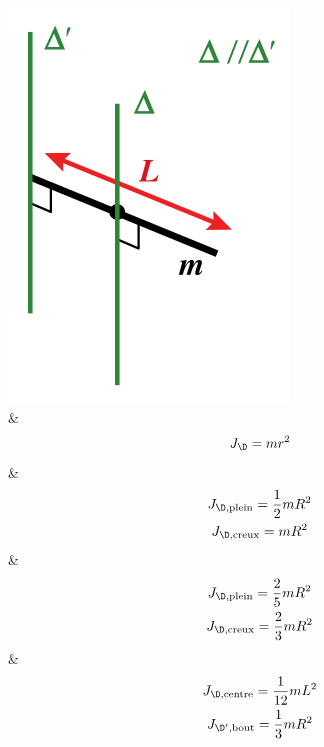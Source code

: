\documentclass[../../main/main.tex]{subfiles}
\begin{document}
\begin{tcb*}[tabularx={l|Y|Y|Y|Y|}]
	\includegraphics[scale=1]{Jd_tige}
	\\\hline
	 &
	\begin{gather*}
		J_{\D} = mr^2
	\end{gather*}
	&
	\begin{gather*}
		J_{\D,\rm plein} = \frac{1}{2}mR^2\\
		J_{\D,\rm creux} = mR^2
	\end{gather*}
	&
	\begin{gather*}
		J_{\D,\rm plein} = \frac{2}{5}mR^2\\
		J_{\D,\rm creux} = \frac{2}{3}mR^2
	\end{gather*}
	&
	\begin{gather*}
		J_{\D,\rm centre} = \frac{1}{12}mL^2\\
		J_{\D',\rm bout} = \frac{1}{3}mR^2
	\end{gather*}
	\\\hline
\end{tcb*}
\end{document}
